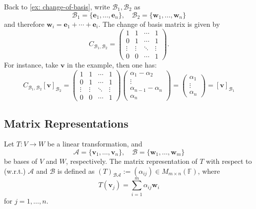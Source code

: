 \begin{example}
Back to \autoref{ex: change-of-basis}, write \( \mathcal{B}_1, \mathcal{B}_2 \) as
\[
\mathcal{B}_1 = \{ \mathbf{e}_1, \ldots, \mathbf{e}_n \}, 
\quad 
\mathcal{B}_2 = \{ \mathbf{w}_1, \ldots, \mathbf{w}_n \}
\]
and therefore \( \mathbf{w}_i = \mathbf{e}_1 + \cdots + \mathbf{e}_i \). The change of basis matrix is given by
\[
C_{\mathcal{B}_1, \mathcal{B}_2} = 
\begin{pmatrix}
1 & 1 & \cdots & 1 \\
0 & 1 & \cdots & 1 \\
\vdots & \vdots & \ddots & \vdots \\
0 & 0 & \cdots & 1
\end{pmatrix}.
\]
For instance, take \( \mathbf{v} \) in the example, then one has:
\[
C_{\mathcal{B}_1, \mathcal{B}_2} [\mathbf{v}]_{\mathcal{B}_2} = 
\begin{pmatrix}
1 & 1 & \cdots & 1 \\
0 & 1 & \cdots & 1 \\
\vdots & \vdots & \ddots & \vdots \\
0 & 0 & \cdots & 1
\end{pmatrix}
\begin{pmatrix}
\alpha_1 - \alpha_2 \\
\vdots \\
\alpha_{n-1} - \alpha_n \\
\alpha_n
\end{pmatrix}
=
\begin{pmatrix}
\alpha_1 \\
\vdots \\
\alpha_n
\end{pmatrix}
= [\mathbf{v}]_{\mathcal{B}_1}
\]
\end{example}

\subsection{Matrix Representations}
\begin{definition}
Let \( T : V \to W \) be a linear transformation, and
\[
\mathcal{A} = \{ \mathbf{v}_1, \ldots, \mathbf{v}_n \}, 
\quad 
\mathcal{B} = \{ \mathbf{w}_1, \ldots, \mathbf{w}_m \}
\]
be bases of \( V \) and \( W \), respectively. The matrix representation of \( T \) with respect to (w.r.t.) \( \mathcal{A} \) and \( \mathcal{B} \) is defined as \( (T)_{\mathcal{B}\mathcal{A}} := (\alpha_{ij}) \in M_{m \times n}(\mathbb{F}) \), where
\[
T(\mathbf{v}_j) = \sum_{i=1}^m \alpha_{ij} \mathbf{w}_i
\]
for $j = 1, \dots, n$.
\end{definition}


